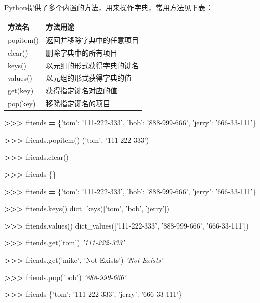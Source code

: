 \documentclass[]{ctexbook}
\newenvironment{Shaded}{\begin{snugshade}}{\end{snugshade}}
\newcommand{\CommentTok}[1]{\textcolor[rgb]{0.56,0.35,0.01}{\textit{#1}}}
\newcommand{\NormalTok}[1]{#1}
\newcommand{\OperatorTok}[1]{\textcolor[rgb]{0.81,0.36,0.00}{\textbf{#1}}}
\newcommand{\StringTok}[1]{\textcolor[rgb]{0.31,0.60,0.02}{#1}}
\begin{document}
Python提供了多个内置的方法，用来操作字典，常用方法见下表：

\begin{longtable}[]{@{}ll@{}}
\toprule
方法名 & 方法用途\tabularnewline
\midrule
\endhead
popitem() & 返回并移除字典中的任意项目\tabularnewline
clear() & 删除字典中的所有项目\tabularnewline
keys() & 以元组的形式获得字典的键名\tabularnewline
values() & 以元组的形式获得字典的值\tabularnewline
get(key) & 获得指定键名对应的值\tabularnewline
pop(key) & 移除指定键名的项目\tabularnewline
\bottomrule
\end{longtable}

\begin{Shaded}
\begin{Highlighting}[]
\OperatorTok{>>>}\NormalTok{ friends }\OperatorTok{=}\NormalTok{ \{}\StringTok{'tom'}\NormalTok{: }\StringTok{'111-222-333'}\NormalTok{, }\StringTok{'bob'}\NormalTok{: }\StringTok{'888-999-666'}\NormalTok{, }\StringTok{'jerry'}\NormalTok{: }\StringTok{'666-33-111'}\NormalTok{\}}

\OperatorTok{>>>}\NormalTok{ friends.popitem()}
\NormalTok{(}\StringTok{'tom'}\NormalTok{, }\StringTok{'111-222-333'}\NormalTok{)}

\OperatorTok{>>>}\NormalTok{ friends.clear()}

\OperatorTok{>>>}\NormalTok{  friends}
\NormalTok{\{\}}

\OperatorTok{>>>}\NormalTok{ friends }\OperatorTok{=}\NormalTok{ \{}\StringTok{'tom'}\NormalTok{: }\StringTok{'111-222-333'}\NormalTok{, }\StringTok{'bob'}\NormalTok{: }\StringTok{'888-999-666'}\NormalTok{, }\StringTok{'jerry'}\NormalTok{: }\StringTok{'666-33-111'}\NormalTok{\}}

\OperatorTok{>>>}\NormalTok{ friends.keys()}
\NormalTok{dict_keys([}\StringTok{'tom'}\NormalTok{, }\StringTok{'bob'}\NormalTok{, }\StringTok{'jerry'}\NormalTok{])}

\OperatorTok{>>>}\NormalTok{ friends.values()}
\NormalTok{dict_values([}\StringTok{'111-222-333'}\NormalTok{, }\StringTok{'888-999-666'}\NormalTok{, }\StringTok{'666-33-111'}\NormalTok{])}

\OperatorTok{>>>}\NormalTok{ friends.get(}\StringTok{'tom'}\NormalTok{)}
\CommentTok{'111-222-333'}

\OperatorTok{>>>}\NormalTok{ friends.get(}\StringTok{'mike'}\NormalTok{, }\StringTok{'Not Exists'}\NormalTok{)}
\CommentTok{'Not Exists'}

\OperatorTok{>>>}\NormalTok{ friends.pop(}\StringTok{'bob'}\NormalTok{)}
\CommentTok{'888-999-666'}

\OperatorTok{>>>}\NormalTok{ friends}
\NormalTok{\{}\StringTok{'tom'}\NormalTok{: }\StringTok{'111-222-333'}\NormalTok{, }\StringTok{'jerry'}\NormalTok{: }\StringTok{'666-33-111'}\NormalTok{\}}
\end{Highlighting}
\end{Shaded}
\end{document}
